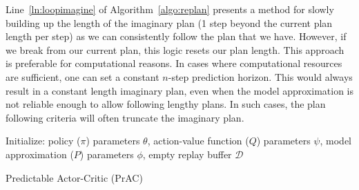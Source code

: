 \documentclass[letterpaper]{article} %
\DeclareMathOperator*{\argmax}{arg\,max}
\begin{document}

Line~\ref{ln:loopimagine} of Algorithm~\ref{algo:replan} presents a method for slowly building up the length of the imaginary plan (1 step beyond the current plan length per step) as we can consistently follow the plan that we have. However, if we break from our current plan, this logic resets our plan length. This approach is preferable for computational reasons. In cases where computational resources are sufficient, one can set a constant $n$-step prediction horizon. This would always result in a constant length imaginary plan, even when the model approximation is not reliable enough to allow following lengthy plans. In such cases, the plan following criteria will often truncate the imaginary plan.  


\begin{algorithm}[h]%
 Initialize: policy ($\pi$) parameters $\theta$, action-value function ($Q$) parameters $\psi$, model approximation ($P$) parameters $\phi$, empty replay buffer $\mathcal{D}$ \label{ln:init}\\
\caption{Predictable Actor-Critic (PrAC)}
\label{algo:PAC}
\end{algorithm}
\end{document}
